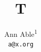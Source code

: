 \documentclass{article}
\usepackage{authblk,varwidth}
\title{T}
\author[ ]{\begin{minipage}{\linewidth}Ann Able{\textsuperscript{1}}\par \texttt{a@x.org}\end{minipage}}

\maketitle
Text.

